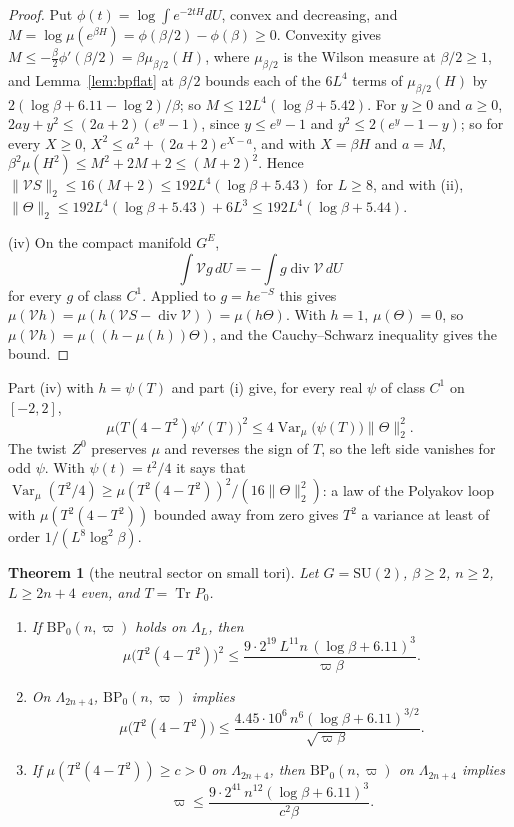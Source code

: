 \documentclass[aps,prd,twocolumn,superscriptaddress,nofootinbib,longbibliography,floatfix,amsmath,amssymb,10pt]{revtex4-2}
\newtheorem{theorem}{Theorem}
\theoremstyle{definition}
\theoremstyle{remark}
\newcommand{\SU}{\mathrm{SU}}
\newcommand{\Tr}{\operatorname{Tr}}
\newcommand{\Var}{\operatorname{Var}}
\begin{document}
\begin{proof}
Put $\phi(t)=\log\int e^{-2tH}dU$, convex and decreasing, and $M=\log\mu(
e^{\beta H})=\phi(\beta/2)-\phi(\beta)\ge0$. Convexity gives $M\le-\frac
\beta2\phi'(\beta/2)=\beta\mu_{\beta/2}(H)$, where $\mu_{\beta/2}$ is the
Wilson measure at $\beta/2\ge1$, and Lemma~\ref{lem:bpflat} at $\beta/2$
bounds each of the $6L^4$ terms of $\mu_{\beta/2}(H)$ by $2(\log\beta+6.11-
\log2)/\beta$; so $M\le12L^4(\log\beta+5.42)$. For $y\ge0$ and $a\ge0$,
$2ay+y^2\le(2a+2)(e^y-1)$, since $y\le e^y-1$ and $y^2\le2(e^y-1-y)$; so for
every $X\ge0$, $X^2\le a^2+(2a+2)e^{X-a}$, and with $X=\beta H$ and $a=M$,
$\beta^2\mu(H^2)\le M^2+2M+2\le(M+2)^2$. Hence $\lVert\mathcal VS\rVert_2\le
16(M+2)\le192L^4(\log\beta+5.43)$ for $L\ge8$, and with (ii), $\lVert\Theta
\rVert_2\le192L^4(\log\beta+5.43)+6L^3\le192L^4(\log\beta+5.44)$.

(iv) On the compact manifold $G^E$,
\[
\int\mathcal Vg\,dU=-\int g\operatorname{div}\mathcal V\,dU
\]
for every $g$ of class $C^1$. Applied to
$g=he^{-S}$ this gives $\mu(\mathcal Vh)=\mu(h(\mathcal VS-
\operatorname{div}\mathcal V))=\mu(h\Theta)$. With $h=1$, $\mu(\Theta)=0$,
so $\mu(\mathcal Vh)=\mu((h-\mu(h))\Theta)$, and the Cauchy--Schwarz
inequality gives the bound.
\end{proof}

Part (iv) with $h=\psi(T)$ and part (i) give, for every real $\psi$ of class
$C^1$ on $[-2,2]$,
\begin{equation}\label{eq:bpanticonc}
\mu\bigl(T(4-T^2)\psi'(T)\bigr)^2\le4\Var_\mu\bigl(\psi(T)\bigr)\lVert
\Theta\rVert_2^2 .
\end{equation}
The twist $Z^0$ preserves $\mu$ and reverses the sign of $T$, so the left
side vanishes for odd $\psi$. With $\psi(t)=t^2/4$ it says that
$\Var_\mu(T^2/4)\ge\mu(T^2(4-T^2))^2/(16\lVert\Theta\rVert_2^2)$: a law of
the Polyakov loop with $\mu(T^2(4-T^2))$ bounded away from zero gives $T^2$ a
variance at least of order $1/(L^8\log^2\beta)$.

\begin{theorem}[the neutral sector on small tori]\label{thm:bpneutral}
Let $G=\SU(2)$, $\beta\ge2$, $n\ge2$, $L\ge2n+4$ even, and $T=\Tr P_0$.
\begin{enumerate}[label=\textup{(\roman*)},leftmargin=*]
\item If $\mathrm{BP}_0(n,\varpi)$ holds on $\Lambda_L$, then
\[
\mu\bigl(T^2(4-T^2)\bigr)^2\le\frac{9\cdot2^{19}\,L^{11}n\,(\log\beta+
6.11)^3}{\varpi\beta}.
\]
\item On $\Lambda_{2n+4}$, $\mathrm{BP}_0(n,\varpi)$ implies
\[
\mu\bigl(T^2(4-T^2)\bigr)\le\frac{4.45\cdot10^6\,n^6(\log\beta+6.11)^{3/2}}
{\sqrt{\varpi\beta}} .
\]
\item If $\mu(T^2(4-T^2))\ge c>0$ on $\Lambda_{2n+4}$, then
$\mathrm{BP}_0(n,\varpi)$ on $\Lambda_{2n+4}$ implies
\[
\varpi\le\frac{9\cdot2^{41}\,n^{12}(\log\beta+6.11)^3}{c^2\beta}.
\]
\end{enumerate}
\end{theorem}
\end{document}
